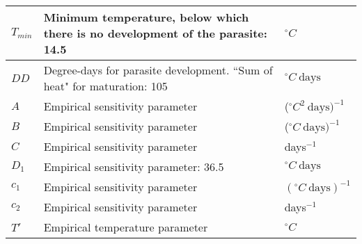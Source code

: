 \documentclass[3p,times]{elsarticle}
\begin{document}
\begin{table}[h]
\begin{tabular}{|l l l|}
$T_{min}$  & Minimum temperature, below which there is no development of the parasite: 14.5 & $^\circ C$ \\ \hline
$DD$  & Degree-days for parasite development.
             ``Sum of heat" for maturation: 105 \cite{McCord2016} & $^\circ C \ \text{days}$ \\ \hline
$A$  & Empirical sensitivity parameter & ($^\circ C^2 \ \text{days})^{-1}$ \\ \hline
$B$  & Empirical sensitivity parameter & ($^\circ C \ \text{days})^{-1}$ \\ \hline
$C$  & Empirical sensitivity parameter & days$^{-1}$ \\ \hline
$D_1$  & Empirical sensitivity parameter: 36.5 & $^\circ C \ \text{days}$ \\ \hline
$c_1$  & Empirical sensitivity parameter & $(^\circ C \ \text{days})^{-1}$ \\ \hline
$c_2$  & Empirical sensitivity parameter & days$^{-1}$ \\ \hline
$T'$  & Empirical temperature parameter & $^\circ C$ \\ \hline
\end{tabular}
\end{table}




%
%


\end{document}
